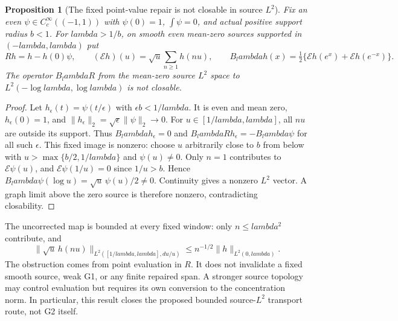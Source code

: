 \documentclass[11pt]{article}
\def\lambda{lambda}%
\newtheorem{proposition}[theorem]{Proposition}
\theoremstyle{remark}
\begin{document}
\begin{proposition}[The fixed point-value repair is not closable in source $L^2$]
\label{prop:v127-nonclosable}
Fix an even $\psi\in C_c^\infty((-1,1))$ with $\psi(0)=1$,
$\int\psi=0$, and actual positive support radius $b<1$.
For $\lambda>1/b$, on smooth even mean-zero sources supported in
$(-\lambda,\lambda)$ put
\[
 Rh=h-h(0)\psi,\qquad
 (\mathcal Eh)(u)=\sqrt u\sum_{n\ge1}h(nu),\qquad
 B_\lambda h(x)=\tfrac12\{\mathcal Eh(e^x)+\mathcal Eh(e^{-x})\}.
\]
The operator $B_\lambda R$ from the mean-zero source $L^2$ space
to $L^2(-\log\lambda,\log\lambda)$ is not closable.
\end{proposition}
\begin{proof}
Let $h_\epsilon(t)=\psi(t/\epsilon)$ with $\epsilon b<1/\lambda$.
It is even and mean zero, $h_\epsilon(0)=1$, and
$\|h_\epsilon\|_2=\sqrt\epsilon\|\psi\|_2\to0$.
For $u\in[1/\lambda,\lambda]$, all $nu$ are outside its support.
Thus $B_\lambda h_\epsilon=0$ and
$B_\lambda R h_\epsilon=-B_\lambda\psi$ for all such $\epsilon$.
This fixed image is nonzero: choose $u$ arbitrarily close to $b$
from below with $u>\max\{b/2,1/\lambda\}$ and $\psi(u)\ne0$.
Only $n=1$ contributes to $\mathcal E\psi(u)$, and
$\mathcal E\psi(1/u)=0$ since $1/u>b$. Hence
$B_\lambda\psi(\log u)=\sqrt u\,\psi(u)/2\ne0$.
Continuity gives a nonzero $L^2$ vector. A graph limit above the zero
source is therefore nonzero, contradicting closability.
\end{proof}

The uncorrected map is bounded at every fixed window: only
$n\le\lambda^2$ contribute, and
\[
 \|\sqrt u\,h(nu)\|_{L^2([1/\lambda,\lambda],du/u)}
 \le n^{-1/2}\|h\|_{L^2(0,\lambda)}.
\]
The obstruction comes from point evaluation in $R$. It does not
invalidate a fixed smooth source, weak G1, or any finite repaired
span. A stronger source topology may control evaluation but requires
its own conversion to the concentration norm. In particular, this
result closes the proposed bounded source-$L^2$ transport route, not
G2 itself.
\end{document}
